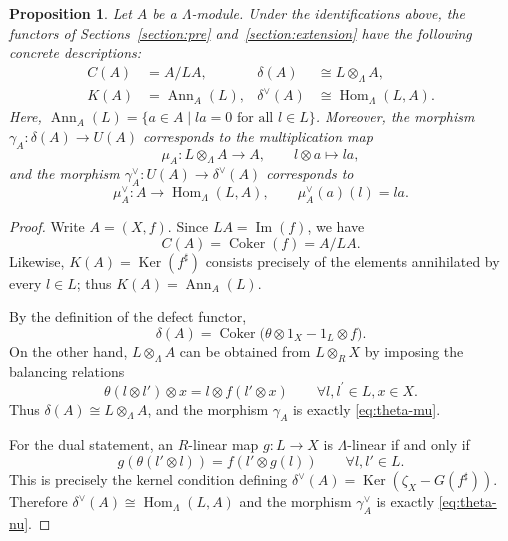 \documentclass[11pt,reqno]{amsart}
\numberwithin{equation}{section}
\newtheorem{proposition}[theorem]{Proposition}
\newcommand{\Hom}{\operatorname{Hom}}
\newcommand{\Coker}{\operatorname{Coker}}
\newcommand{\Ker}{\operatorname{Ker}}
\newcommand{\Ima}{\operatorname{Im}}
\newcommand{\Ann}{\operatorname{Ann}}
\begin{document}
\begin{proposition}\label{prop:theta-functors}
Let $A$ be a $\Lambda$-module. Under the identifications above, the functors of  Sections~{\ref{section:pre}} and~{\ref{section:extension}} have the following concrete descriptions:
\begin{align*}
C(A)&= A/LA, & \delta(A)&\cong L\otimes_\Lambda A,\\
K(A)&=\Ann_A(L), & \delta^\vee(A)&\cong\Hom_\Lambda(L,A).
\end{align*}
Here, $\Ann_A(L)=\{a\in A\mid la=0\text{ for all } l\in L\}$. Moreover, the morphism
$
\gamma_A\colon\delta(A)\to U(A)
$
corresponds to the multiplication map
\begin{equation}\label{eq:theta-mu}
\mu_A\colon L\otimes_\Lambda A\longrightarrow A,
\qquad l\otimes a\longmapsto la,
\end{equation}
and the morphism $\gamma^\vee_A\colon U(A)\to \delta^\vee(A)$ corresponds to
\begin{equation}\label{eq:theta-nu}
\mu^\vee_A\colon A\longrightarrow\Hom_\Lambda(L,A),
\qquad \mu^\vee_A(a)(l)=la.
\end{equation}
\end{proposition}

\begin{proof}
Write $A=(X,f)$. Since $LA=\Ima(f)$, we have
\[
C(A)=\Coker(f)= A/LA.
\]
Likewise, $K(A)=\Ker(f^\sharp)$ consists precisely of the elements annihilated by every $l\in L$; thus $K(A)=\Ann_A(L)$.

By the definition of the defect functor,
\[
\delta(A)=\Coker\bigl(\theta\otimes1_X-1_L\otimes f\bigr).
\]
On the other hand, $L\otimes_\Lambda A$ can be obtained from $L\otimes_RX$ by imposing the balancing relations
\[
\theta(l\otimes l')\otimes x
=l\otimes f(l'\otimes x)\qquad \forall l,l^\prime\in L, x\in X.
\]
Thus $\delta(A)\cong L\otimes_\Lambda A$, and the morphism $\gamma_A$ is exactly \eqref{eq:theta-mu}.

For the dual statement, an $R$-linear map $g\colon L\to X$ is $\Lambda$-linear if and only if
\[
g(\theta(l'\otimes l))=f(l'\otimes g(l))
\qquad \forall l,l'\in L.
\]
This is precisely the kernel condition defining $\delta^\vee(A)=\Ker(\zeta_X-G(f^\sharp))$. Therefore $\delta^\vee(A)\cong\Hom_\Lambda(L,A)$ and the morphism $\gamma^\vee_A$ is exactly \eqref{eq:theta-nu}.
\end{proof}
\end{document}
